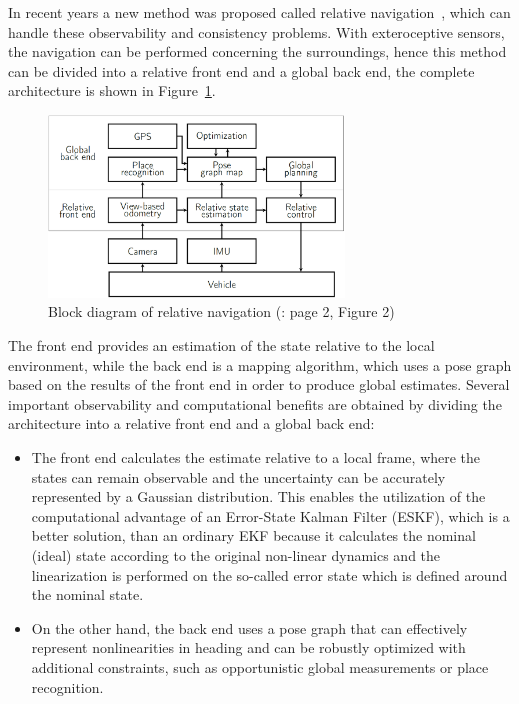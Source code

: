 In recent years a new method was proposed called relative navigation~\cite{rel-nav-1, rel-nav-2}, which can handle these observability and consistency problems. With exteroceptive sensors, the navigation can be performed concerning the surroundings, hence this method can be divided into a relative front end and a global back end, the complete architecture is shown in Figure~\ref{fig:real-nav}. 
\begin{figure}[!ht]
    \centering
    \includegraphics[width=0.7\textwidth]{figures/rel-nav}
    \caption{Block diagram of relative navigation (\cite{rel-nav}: page 2, Figure 2)}\label{fig:real-nav}
\end{figure}
The front end provides an estimation of the state relative to the local environment, while the back end is a mapping algorithm, which uses a pose graph based on the results of the front end in order to produce global estimates. Several important observability and computational benefits are obtained by dividing the architecture into a relative front end and a global back end:
\begin{itemize}
    \item 
    The front end calculates the estimate relative to a local frame, where the states can remain observable and the uncertainty can be accurately represented by a Gaussian distribution. This enables the utilization of the computational advantage of an Error-State Kalman Filter (ESKF), which is a better solution, than an ordinary EKF because it calculates the nominal (ideal) state according to the original non-linear dynamics and the linearization is performed on the so-called error state which is defined around the nominal state.
    
    \item 
     On the other hand, the back end uses a pose graph that can effectively represent nonlinearities in heading and can be robustly optimized with additional constraints, such as opportunistic global measurements or place recognition.
\end{itemize}


